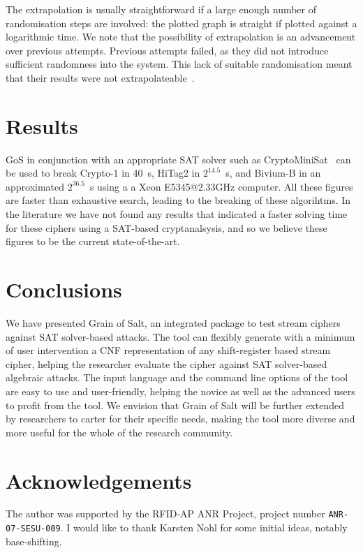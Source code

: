 \documentclass{llncs}
\begin{document}
The extrapolation is usually straightforward if a large enough number of randomisation steps are involved: the plotted graph is straight if plotted against a logarithmic time. We note that the possibility of extrapolation is an advancement over previous attempts. Previous attempts failed, as they did not introduce sufficient randomness into the system. This lack of suitable randomisation meant that their results were not extrapolateable~\cite{BiviumWithMiniSat,BiviumWithSATsolvers}.

\section{Results}
\label{sect:results}
GoS in conjunction with an appropriate SAT solver such as CryptoMiniSat~\cite{CryptoMiniSat} can be used to break Crypto-1 in 40~s, HiTag2 in $2^{14.5}$~s, and Bivium-B in an approximated $2^{36.5}$~s using a a Xeon E5345@2.33GHz computer. All these figures are faster than exhaustive search, leading to the breaking of these algorihtms. In the literature we have not found any results that indicated a faster solving time for these ciphers using a SAT-based cryptanalsysis, and so we believe these figures to be the current state-of-the-art.

\section{Conclusions}
\label{sect:conclusions}
We have presented Grain of Salt, an integrated package to test stream ciphers against SAT solver-based attacks. The tool can flexibly generate with a minimum of user intervention a CNF representation of any shift-register based stream cipher, helping the researcher evaluate the cipher against SAT solver-based algebraic attacks. The input language and the command line options of the tool are easy to use and user-friendly, helping the novice as well as the advanced users to profit from the tool. We envision that Grain of Salt will be further extended by researchers to carter for their specific needs, making the tool more diverse and more useful for the whole of the research community.

\section*{Acknowledgements}
The author was supported by the RFID-AP ANR Project, project number \texttt{ANR-07-SESU-009}. I would like to thank Karsten Nohl for some initial ideas, notably base-shifting.




\vfill
\pagebreak
\end{document}
